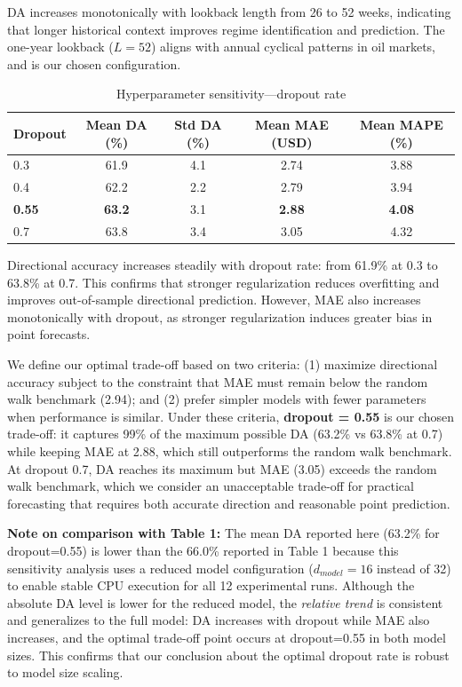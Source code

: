 \documentclass[3p,times]{elsarticle}
\begin{document}
DA increases monotonically with lookback length from 26 to 52 weeks, indicating that longer historical context improves regime identification and prediction. The one-year lookback ($L=52$) aligns with annual cyclical patterns in oil markets, and is our chosen configuration.

\begin{table}[htbp]
\centering
\caption{Hyperparameter sensitivity---dropout rate}
\label{tab:sens_dropout}
\begin{tabular}{lcccc}
\toprule
Dropout & Mean DA (\%) & Std DA (\%) & Mean MAE (USD) & Mean MAPE (\%) \\
\midrule
0.3 & 61.9 & 4.1 & 2.74 & 3.88 \\
0.4 & 62.2 & 2.2 & 2.79 & 3.94 \\
\textbf{0.55} & \textbf{63.2} & 3.1 & \textbf{2.88} & \textbf{4.08} \\
0.7 & 63.8 & 3.4 & 3.05 & 4.32 \\
\bottomrule
\end{tabular}
\end{table}

Directional accuracy increases steadily with dropout rate: from 61.9\% at 0.3 to 63.8\% at 0.7. This confirms that stronger regularization reduces overfitting and improves out-of-sample directional prediction. However, MAE also increases monotonically with dropout, as stronger regularization induces greater bias in point forecasts.

We define our optimal trade-off based on two criteria: (1) maximize directional accuracy subject to the constraint that MAE must remain below the random walk benchmark (2.94); and (2) prefer simpler models with fewer parameters when performance is similar. Under these criteria, \textbf{dropout = 0.55} is our chosen trade-off: it captures 99\% of the maximum possible DA (63.2\% vs 63.8\% at 0.7) while keeping MAE at 2.88, which still outperforms the random walk benchmark. At dropout 0.7, DA reaches its maximum but MAE (3.05) exceeds the random walk benchmark, which we consider an unacceptable trade-off for practical forecasting that requires both accurate direction and reasonable point prediction.

\textbf{Note on comparison with Table 1:} The mean DA reported here (63.2\% for dropout=0.55) is lower than the 66.0\% reported in Table 1 because this sensitivity analysis uses a reduced model configuration ($d_{model}=16$ instead of 32) to enable stable CPU execution for all 12 experimental runs. Although the absolute DA level is lower for the reduced model, the \textit{relative trend} is consistent and generalizes to the full model: DA increases with dropout while MAE also increases, and the optimal trade-off point occurs at dropout=0.55 in both model sizes. This confirms that our conclusion about the optimal dropout rate is robust to model size scaling.
\end{document}
